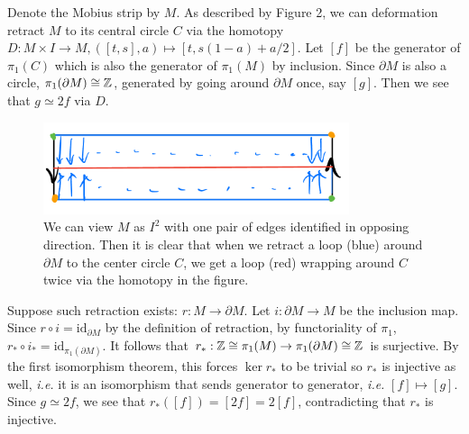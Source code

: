 \documentclass[12pt]{article}
\begin{document}
\begin{problem}[6]
	Denote the Mobius strip by $ M$. As described by Figure 2, we can deformation retract $ M$ to its central circle $ C$ via the homotopy $ D: M \times I \to M, ([t,s],a) \mapsto [t, s(1-a)+ a/2]$. Let $ [f]$ be the generator of  $ \pi_1( C)$ which is also the generator of $ \pi_1( M)$ by inclusion. Since $ \partial M$ is also a circle, $ \pi_1( \partial M) \cong \mathbb{Z}$, generated by going around $ \partial M$ once, say $ [ g]$. Then we see that $g \simeq 2 f$ via $ D$.
~\begin{figure}[H]
	\centering
	\includegraphics[width=0.8\textwidth]{./figures/mobius.png}
	\caption{We can view $ M$  as $ I^2$ with one pair of edges identified in opposing direction. Then it is clear that when we retract a loop (blue) around $ \partial M$ to the center circle $ C$, we get a loop (red) wrapping around  $ C$ twice via the homotopy in the figure.}
\end{figure}
	Suppose such retraction exists: $ r: M \to \partial M$. Let $ i: \partial M \to M$ be the inclusion map. Since $ r \circ i = \text{id}_{ \partial M}$ by the definition of retraction, by functoriality of $ \pi_1$, $ r_* \circ i_* = \text{id}_{ \pi_1( \partial M) }$. It follows that $ r_*: \mathbb{Z} \cong \pi_1( M) \to \pi_1( \partial M) \cong \mathbb{Z}$ is surjective. By the first isomorphism theorem, this forces $ \ker r_*$ to be trivial so $ r_*$ is injective as well, \emph{i.e.} it is an isomorphism that sends generator to generator, \emph{i.e.} $ [f] \mapsto [g]$. Since $ g \simeq 2f$, we see that $ r_* ([f]) = [2f] = 2 [f]$, contradicting that $ r_*$ is injective. 
\end{problem}
\end{document}
